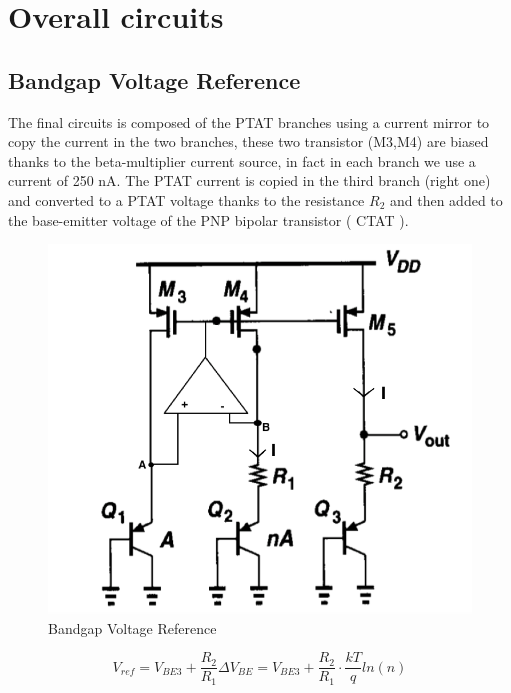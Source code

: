 \documentclass[11pt,a4paper]{report}
\begin{document}
\section{Overall circuits}
\subsection{Bandgap Voltage Reference}

The final circuits is composed of the PTAT branches using a current mirror to copy the current in the two branches, these two transistor (M3,M4) are biased thanks to the beta-multiplier current source, in fact in each branch we use a current of 250 nA. The PTAT current is copied in the third branch (right one) and converted to a PTAT voltage thanks to the resistance $R_2$ and then added to the base-emitter voltage of the PNP bipolar transistor ( CTAT ). 

\begin{figure}[h]
  \begin{center}
    \includegraphics[scale=0.5]{photo/bandgap_3pnp}
  \end{center}
  \caption{Bandgap Voltage Reference}
  \label{bandgap_3pnp}
\end{figure}

\begin{equation}
  V_{ref} = V_{BE3} + \frac{R_2}{R_1} \Delta V_{BE} = V_{BE3} + \frac{R_2}{R_1} \cdot \frac{kT}{q}ln(n)
\end{equation}
\end{document}
